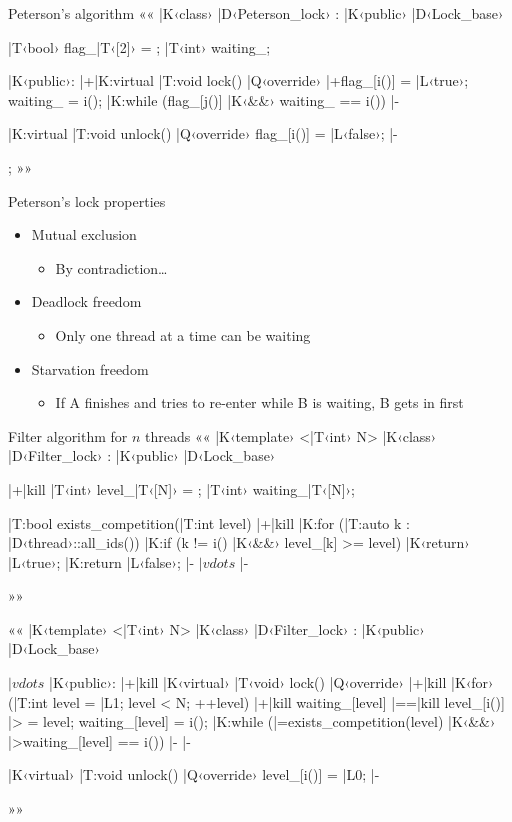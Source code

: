\documentclass{beamer}
\begin{document}
\begin{frame}[fragile]{Peterson's algorithm}{}
  ««
  |K‹class› |D‹Peterson_lock› : |K‹public› |D‹Lock_base›
  {
  	|T‹bool› flag_|T‹[2]› = {};
  	|T‹int› waiting_;

  |K‹public›:
  	|+|K:virtual |T:void lock() |Q‹override›
    {
    	|+flag_[i()] = |L‹true›;
      waiting_ = i();
      |K:while (flag_[j()] |K‹&&› waiting_ == i()) {} |-
    }

    |K:virtual |T:void unlock() |Q‹override›
    { flag_[i()] = |L‹false›; } |-
  };
  »»
\end{frame}

\begin{frame}{Peterson's lock properties}
  \begin{itemize}
    \item Mutual exclusion
      \begin{itemize}
        \item By contradiction\ldots
      \end{itemize}
    \item Deadlock freedom
      \begin{itemize}
        \item Only one thread at a time can be waiting
      \end{itemize}
    \item Starvation freedom
      \begin{itemize}
        \item If A finishes and tries to re-enter while B is waiting, B gets
          in first
      \end{itemize}
  \end{itemize}
\end{frame}

\begin{frame}[fragile]{Filter algorithm for $n$ threads}{}
  ««
  |K‹template› <|T‹int› N>
  |K‹class› |D‹Filter_lock› : |K‹public› |D‹Lock_base›
  {
  	|+|kill%
    |T‹int› level_|T‹[N]› = {};
    |T‹int› waiting_|T‹[N]›;

    |T:bool exists_competition(|T:int level)
    {
    	|+|kill%
      |K:for (|T:auto k : |D‹thread›::all_ids())
      	|K:if (k != i() |K‹&&› level_[k] >= level)
      		|K‹return› |L‹true›;
      |K:return |L‹false›; |-
    }
    $|vdots$ |-
  }
  »»
\end{frame}

\begin{frame}[fragile]{}{}
  ««
  |K‹template› <|T‹int› N>
  |K‹class› |D‹Filter_lock› : |K‹public› |D‹Lock_base›
  {
  $|vdots$
  |K‹public›:
  	|+|kill%
    |K‹virtual› |T‹void› lock() |Q‹override›
    {
    	|+|kill%
      |K‹for› (|T:int level = |L1; level < N; ++level) {
      	|+|kill%
        waiting_[level] |==|kill%
        level_[i()] |> = level;
        waiting_[level] = i();
        |K:while (|=exists_competition(level) |K‹&&›
                  |>waiting_[level] == i()) {} |-
      } |-
    }
    
    |K‹virtual› |T:void unlock() |Q‹override›
    { level_[i()] = |L0; } |-
  }
  »»
\end{frame}
\end{document}
